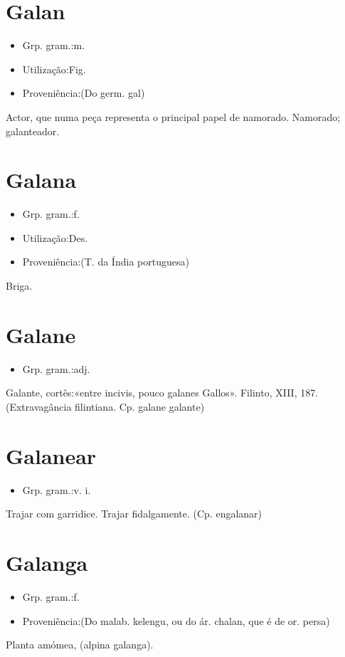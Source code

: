 \section{Galan}
\begin{itemize}
\item {Grp. gram.:m.}
\end{itemize}
\begin{itemize}
\item {Utilização:Fig.}
\end{itemize}
\begin{itemize}
\item {Proveniência:(Do germ. \textunderscore gal\textunderscore )}
\end{itemize}
Actor, que numa peça representa o principal papel de namorado.
Namorado; galanteador.
\section{Galana}
\begin{itemize}
\item {Grp. gram.:f.}
\end{itemize}
\begin{itemize}
\item {Utilização:Des.}
\end{itemize}
\begin{itemize}
\item {Proveniência:(T. da Índia portuguesa)}
\end{itemize}
Briga.
\section{Galane}
\begin{itemize}
\item {Grp. gram.:adj.}
\end{itemize}
Galante, cortês:«\textunderscore entre incivis, pouco galanes Gallos\textunderscore ». Filinto, XIII, 187.
(Extravagância filintiana. Cp. \textunderscore galan\textunderscore  e \textunderscore galante\textunderscore )
\section{Galanear}
\begin{itemize}
\item {Grp. gram.:v. i.}
\end{itemize}
Trajar com garridice.
Trajar fidalgamente.
(Cp. \textunderscore engalanar\textunderscore )
\section{Galanga}
\begin{itemize}
\item {Grp. gram.:f.}
\end{itemize}
\begin{itemize}
\item {Proveniência:(Do malab. \textunderscore kelengu\textunderscore , ou do ár. \textunderscore chalan\textunderscore , que é de or. persa)}
\end{itemize}
Planta amómea, (\textunderscore alpina galanga\textunderscore ).
